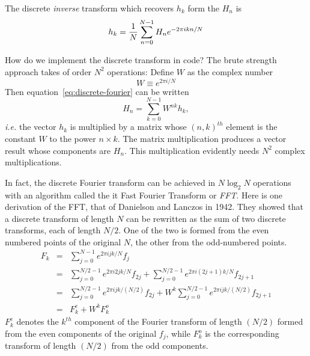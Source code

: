 \documentclass{article}
\newcommand{\bua}{\begin{eqnarray*}}
\newcommand{\eua}{\end{eqnarray*}}
\begin{document}
The discrete {\it inverse} transform which recovers $h_k$ form the $H_n$ is
\[
h_k={1\over N}\sum_{n=0}^{N-1}H_n e^{-2\pi ikn/N}
\]

How do we implement the discrete transform in code? The brute strength 
approach takes of order $N^2$ operations: Define $W$ as the complex number
\[
W\equiv e^{2\pi i/N}
\]
Then equation~\ref{eq:discrete-fourier} can be written 
\[
H_n=\sum_{k=0}^{N-1}W^{nk}h_k,
\]
{\it i.e.} the vector $h_k$ is multiplied by a matrix whose $(n,k)^{th}$
element is the constant $W$ to the power $n\times k$. The matrix multiplication
produces a vector result whose components are $H_n$. This multiplication
evidently needs $N^2$ complex multiplications. 

In fact, the discrete Fourier transform can be achieved in $N\log_2 N$ 
operations with an algorithm called the {it Fast Fourier Transform} or 
{\it FFT}. Here is one derivation of the FFT, that of Danielson and Lanczos
in 1942. They showed that a discrete transform of length $N$ can be rewritten
as the sum of two discrete transforms, each of length $N/2$. One of the 
two is formed from the even numbered points of the original $N$, the other 
from the odd-numbered points.
\bua
F_k & = & \sum_{j=0}^{N-1}e^{2\pi ijk/N}f_j \\
    & = & \sum_{j=0}^{{N/2}-1}e^{2\pi i2jk/N}f_{2j}
         +\sum_{j=0}^{{N/2}-1}e^{2\pi i(2j+1)k/N}f_{2j+1} \\
    & = & \sum_{j=0}^{{N/2}-1}e^{2\pi ijk/({N/2})}f_{2j}
         +W^k\sum_{j=0}^{{N/2}-1}e^{2\pi ijk/({N/2})}f_{2j+1} \\
    & = & F_k^e+W^kF_k^o
\eua
$F_k^e$ denotes the $k^{th}$ component of the Fourier transform of length 
$({N/2})$ formed from the even components of the original $f_j$, while $F_k^o$
is the corresponding transform of length $({N/2})$ from the odd components.
\end{document}
